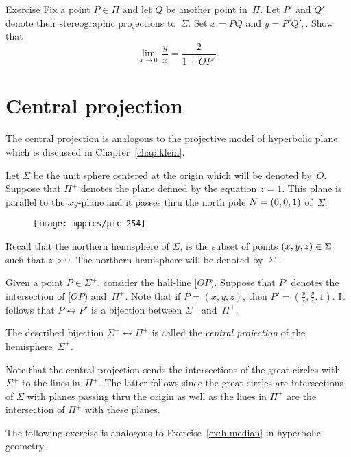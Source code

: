 \begin{thm}{Exercise}\label{ex:conform-sphere}
Fix a point $P\in \Pi$  and let $Q$ be another point in~$\Pi$.
Let $P'$ and $Q'$ denote their stereographic projections to~$\Sigma$.
Set $x=PQ$ and $y=P'Q'_s$.
Show that
$$\lim_{x\to 0}\, \frac{y}{x}=\frac{2}{1+OP^2}.$$
\end{thm}



\section{Central projection}

The central projection is analogous to the projective model of hyperbolic plane which is discussed in Chapter~\ref{chap:klein}.

Let $\Sigma$ be the unit sphere centered at the origin which will be denoted by~$O$.
Suppose that $\Pi^+$ denotes the plane defined by the equation $z=1$.
This plane is parallel to the $xy$-plane and it passes thru 
the north pole $N\z=(0,0,1)$ of~$\Sigma$.

{

\begin{wrapfigure}{r}{40mm}
\centering
\texttt{[image: mppics/pic-254]}
\end{wrapfigure}

Recall that the northern hemisphere of $\Sigma$,
is the subset of points $(x,y,z)\z\in \Sigma$ such that $z>0$.
The northern  hemisphere will be denoted by~$\Sigma^+$.

Given a point $P\in \Sigma^+$, consider the half-line $[OP)$. 
Suppose that $P'$ denotes the intersection of $[OP)$ and~$\Pi^+$.
Note that 
if $P=(x,y,z)$, then $P'=(\tfrac xz,\tfrac yz,1)$.
It follows that $P\leftrightarrow P'$ is a bijection between $\Sigma^+$ and~$\Pi^+$.

}

The described bijection $\Sigma^+\leftrightarrow \Pi^+$ is called the \emph{central projection} of 
the hemisphere~$\Sigma^+$.

Note that the central projection sends the intersections of the great circles with $\Sigma^+$ to the lines in~$\Pi^+$.
The latter follows since the great circles are intersections of $\Sigma$ with planes passing thru the origin
as well as the lines in $\Pi^+$ are the intersection of $\Pi^+$ with these planes.

The following exercise 
is analogous to Exercise~\ref{ex:h-median}
in hyperbolic geometry.

